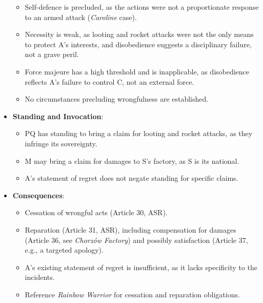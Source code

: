 \begin{itemize}
    \begin{itemize}
        \item Self-defence is precluded, as the actions were not a proportionate response to an armed attack (\textit{Caroline} case).
        \item Necessity is weak, as looting and rocket attacks were not the only means to protect A’s interests, and disobedience suggests a disciplinary failure, not a grave peril.
        \item Force majeure has a high threshold and is inapplicable, as disobedience reflects A’s failure to control C, not an external force.
        \item No circumstances precluding wrongfulness are established.
    \end{itemize}
    \item \textbf{Standing and Invocation}:
    \begin{itemize}
        \item PQ has standing to bring a claim for looting and rocket attacks, as they infringe its sovereignty.
        \item M may bring a claim for damages to S’s factory, as S is its national.
        \item A’s statement of regret does not negate standing for specific claims.
    \end{itemize}
    \item \textbf{Consequences}:
    \begin{itemize}
        \item Cessation of wrongful acts (Article 30, ASR).
        \item Reparation (Article 31, ASR), including compensation for damages (Article 36, see \textit{Chorzów Factory}) and possibly satisfaction (Article 37, e.g., a targeted apology).
        \item A’s existing statement of regret is insufficient, as it lacks specificity to the incidents.
        \item Reference \textit{Rainbow Warrior} for cessation and reparation obligations.
    \end{itemize}
\end{itemize}

